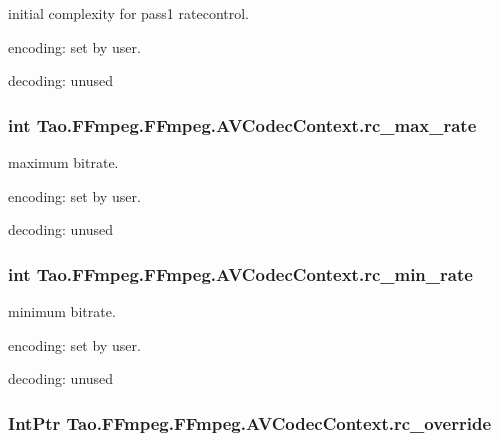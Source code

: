\label{struct_tao_1_1_f_fmpeg_1_1_f_fmpeg_1_1_a_v_codec_context_a105a5045ac9e2d73bbc4e8c63a384542}
initial complexity for pass1 ratecontrol.
\begin{DoxyItemize}
\item encoding: set by user.
\item decoding: unused 
\end{DoxyItemize}\hypertarget{struct_tao_1_1_f_fmpeg_1_1_f_fmpeg_1_1_a_v_codec_context_ae6226709a20212d9e0485919b3c87ccf}{
\subsubsection[{rc\_\-max\_\-rate}]{\setlength{\rightskip}{0pt plus 5cm}int {\bf Tao.FFmpeg.FFmpeg.AVCodecContext.rc\_\-max\_\-rate}}}
\label{struct_tao_1_1_f_fmpeg_1_1_f_fmpeg_1_1_a_v_codec_context_ae6226709a20212d9e0485919b3c87ccf}
maximum bitrate.
\begin{DoxyItemize}
\item encoding: set by user.
\item decoding: unused 
\end{DoxyItemize}\hypertarget{struct_tao_1_1_f_fmpeg_1_1_f_fmpeg_1_1_a_v_codec_context_a2c4a8c07305ee7267255e84aab51e5fd}{
\subsubsection[{rc\_\-min\_\-rate}]{\setlength{\rightskip}{0pt plus 5cm}int {\bf Tao.FFmpeg.FFmpeg.AVCodecContext.rc\_\-min\_\-rate}}}
\label{struct_tao_1_1_f_fmpeg_1_1_f_fmpeg_1_1_a_v_codec_context_a2c4a8c07305ee7267255e84aab51e5fd}
minimum bitrate.
\begin{DoxyItemize}
\item encoding: set by user.
\item decoding: unused 
\end{DoxyItemize}\hypertarget{struct_tao_1_1_f_fmpeg_1_1_f_fmpeg_1_1_a_v_codec_context_a3c76f1e9458cdafec9cf159f51453cf7}{
\subsubsection[{rc\_\-override}]{\setlength{\rightskip}{0pt plus 5cm}IntPtr {\bf Tao.FFmpeg.FFmpeg.AVCodecContext.rc\_\-override}}}
